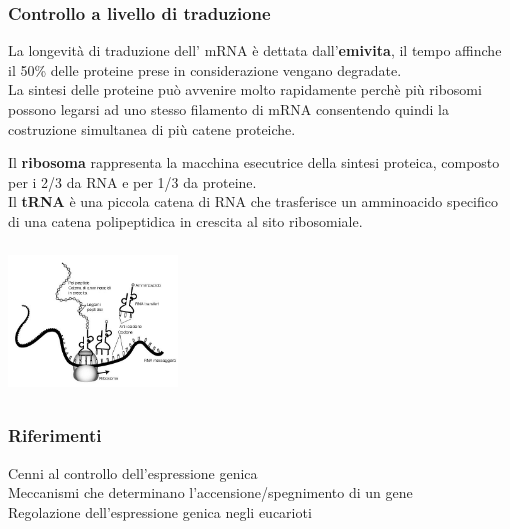 \documentclass[hyperref={pdfpagelabels=false}]{beamer}
\begin{document}
\begin{frame}\frametitle{Controllo a livello di traduzione}
La longevit\`a di traduzione dell' mRNA \`e dettata dall'\textbf{emivita}, il tempo affinche il 50\% delle proteine prese in considerazione vengano degradate.\\
La sintesi delle proteine pu\`o avvenire molto rapidamente perch\`e pi\`u ribosomi possono legarsi ad uno stesso filamento di mRNA consentendo quindi la costruzione simultanea di pi\`u catene proteiche.
\begin{minipage}[c]{.5\textwidth}
Il \textbf{ribosoma} rappresenta la macchina esecutrice della sintesi proteica, composto per i 2/3 da RNA e per 1/3 da proteine.\\
Il \textbf{tRNA} \`e una piccola catena di RNA che trasferisce un amminoacido specifico di una catena polipeptidica in crescita al sito ribosomiale.
\end{minipage}
\begin{minipage}[c]{.45\textwidth}
\includegraphics[width=4.5cm,height=4cm]{traduzione.jpg}
\end{minipage}
\end{frame}


\begin{frame}\frametitle{Riferimenti}
\href{https://github.com/Samnitium/WEB-gene-expression/raw/master/presentazione\%20finale/support/gene_expression_1.pdf}{} Cenni al controllo dell'espressione genica\\
\bigskip
\href{https://github.com/Samnitium/WEB-gene-expression/raw/master/presentazione\%20finale/support/gene_expression_2.pdf}{} Meccanismi che determinano l'accensione/spegnimento di un gene\\
\bigskip
\href{https://github.com/Samnitium/WEB-gene-expression/raw/master/presentazione\%20finale/support/gene_expression_3.pdf}{} Regolazione dell'espressione genica negli eucarioti

\end{frame}
\end{document}
